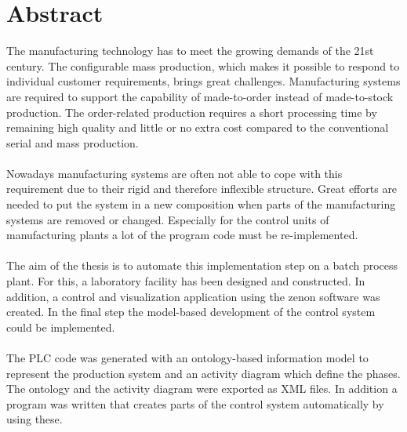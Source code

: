 \chapter*{Abstract}

The manufacturing technology has to meet the growing demands of the 21st century. The configurable mass production, which makes it possible to respond to individual customer requirements, brings great challenges. Manufacturing systems are required to support the capability of made-to-order instead of made-to-stock production. The order-related production requires a short processing time by remaining high quality and little or no extra cost compared to the conventional serial and mass production. \\\\
Nowadays manufacturing systems are often not able to cope with this requirement due to their rigid and therefore inflexible structure. Great efforts are needed to put the system in a new composition when parts of the manufacturing systems are removed or changed. Especially for the control units of manufacturing plants a lot of the program code must be re-implemented.\\\\
The aim of the thesis is to automate this implementation step on a batch process plant. For this, a laboratory facility has been designed and constructed. In addition, a control and visualization application using the zenon software was created. In the final step the model-based development of the control system could be implemented.\\\\
The PLC code was generated with an ontology-based information model to represent the production system and an activity diagram which define the phases. The ontology and the activity diagram were exported as XML files. In addition a program was written that creates parts of the control system automatically by using these.

